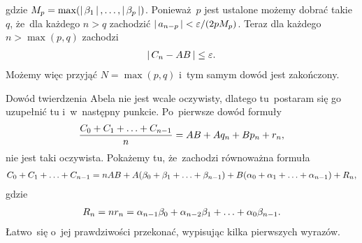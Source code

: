\documentclass[a4paper,11pt]{article}
\begin{document}
gdzie $M_{ p } = \max( \left| \,  \beta_{ 1 }  \, \right|, \ldots, \left| \,  \beta_{ p }  \, \right| )$.
Ponieważ~$p$ jest ustalone możemy dobrać takie $q$, że~dla każdego
$n > q$ zachodzić $\left| \,  a_{ n - p }  \, \right| < \varepsilon / ( 2 p M_{ p } )$.
Teraz dla każdego $n > \max( p, q )$ zachodzi
\begin{equation}
  \label{eq:Leja-18}
  \begin{split}
    \left| \,  C_{ n } - AB  \, \right| \leq \varepsilon.
  \end{split}
\end{equation}
Możemy więc przyjąć $N = \max( p, q )$ i~tym samym dowód jest
zakończony.

\vspace{\spaceFour}


\start {} Dowód twierdzenia Abela nie jest wcale oczywisty,
dlatego tu~postaram się go uzupełnić tu i~w~następny punkcie.
Po~pierwsze dowód formuły
\begin{equation}
  \label{eq:Leja-19}
  \begin{split}
    \frac{ C_{ 0 } + C_{ 1 } + \ldots + C_{ n - 1 } }{ n } = AB + A q_{ n }
    + B p_{ n } + r_{ n },
  \end{split}
\end{equation}
nie jest taki oczywista. Pokażemy tu, że~zachodzi równoważna formuła
\begin{equation}
  \label{eq:Leja-20}
  \begin{split}
    C_{ 0 } + C_{ 1 } + \ldots + C_{ n - 1 } = n AB + A ( \beta_{ 0 } +
    \beta_{ 1 } + \ldots + \beta_{ n - 1 } ) + B ( \alpha_{ 0 } + \alpha_{ 1 } +
    \ldots + \alpha_{ n - 1 } ) + R_{ n },
  \end{split}
\end{equation}
gdzie
\begin{equation}
  \label{eq:Leja-21}
  \begin{split}
    R_{ n } = n r_{ n } = \alpha_{ n - 1 } \beta_{ 0 } + \alpha_{ n - 2 }
    \beta_{ 1 } + \ldots + \alpha_{ 0 } \beta_{ n - 1 }.
  \end{split}
\end{equation}
Łatwo~się o~jej prawdziwości przekonać, wypisując kilka pierwszych
wyrazów.
\end{document}
